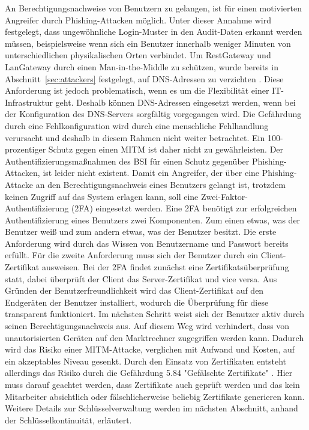 \documentclass[11pt,a4paper]{report}
\begin{document}
An Berechtigungsnachweise von Benutzern zu gelangen, ist für einen motivierten Angreifer durch Phishing-Attacken möglich. Unter dieser Annahme wird festgelegt, dass ungewöhnliche Login-Muster in den Audit-Daten erkannt werden müssen, beispielsweise wenn sich ein Benutzer innerhalb weniger Minuten von unterschiedlichen physikalischen Orten verbindet. Um RestGateway und LanGateway durch einen Man-in-the-Middle zu schützen, wurde bereits in Abschnitt~\ref{sec:attackers} festgelegt, auf DNS-Adressen zu verzichten \cite{bsi_m5059}. Diese Anforderung ist jedoch problematisch, wenn es um die Flexibilität einer IT-Infrastruktur geht. Deshalb können DNS-Adressen eingesetzt werden, wenn bei der Konfiguration des DNS-Servers sorgfältig vorgegangen wird. Die Gefährdung durch eine Fehlkonfiguration wird durch eine menschliche Fehlhandlung verursacht und deshalb in diesem Rahmen nicht weiter betrachtet. Ein 100-prozentiger Schutz gegen einen MITM ist daher nicht zu gewährleisten. Der Authentifizierungsmaßnahmen des BSI für einen Schutz gegenüber Phishing-Attacken, ist leider nicht existent. Damit ein Angreifer, der über eine Phishing-Attacke an den Berechtigungsnachweis eines Benutzers gelangt ist, trotzdem keinen Zugriff auf das System erlagen kann, soll eine Zwei-Faktor-Authentifizierung (2FA) eingesetzt werden. Eine 2FA benötigt zur erfolgreichen Authentifizierung eines Benutzers zwei Komponenten. Zum einen etwas, was der Benutzer weiß und zum andern etwas, was der Benutzer besitzt. Die erste Anforderung wird durch das Wissen von Benutzername und Passwort bereits erfüllt. Für die zweite Anforderung muss sich der Benutzer durch ein Client-Zertifikat ausweisen. Bei der 2FA findet zunächst eine Zertifikatsüberprüfung statt, dabei überprüft der Client das Server-Zertifikat und vice versa. Aus Gründen der Benutzerfreundlichkeit wird das Client-Zertifikat auf den Endgeräten der Benutzer installiert, wodurch die Überprüfung für diese transparent funktioniert. Im nächsten Schritt weist sich der Benutzer aktiv durch seinen Berechtigungsnachweis aus. Auf diesem Weg wird verhindert, dass von unautorisierten Geräten auf den Marktrechner zugegriffen werden kann. Dadurch wird das Risiko einer MITM-Attacke, verglichen mit Aufwand und Kosten, auf ein akzeptables Niveau gesenkt. Durch den Einsatz von Zertifikaten entsteht allerdings das Risiko durch die Gefährdung 5.84 "Gefälschte Zertifikate" \cite{bsi_g5084}. Hier muss darauf geachtet werden, dass Zertifikate auch geprüft werden und das kein Mitarbeiter absichtlich oder fälschlicherweise beliebig Zertifikate generieren kann. Weitere Details zur Schlüsselverwaltung werden im nächsten Abschnitt, anhand der Schlüsselkontinuität, erläutert.
\end{document}
